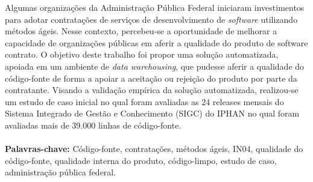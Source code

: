 \begin{resumo}

Algumas organizações da Administração Pública Federal iniciaram investimentos para adotar contratações de serviços de desenvolvimento de \textit{software} utilizando métodos ágeis. Nesse contexto, percebeu-se a oportunidade de melhorar a capacidade de organizações públicas em aferir a qualidade do produto de software contrato. O objetivo deste trabalho foi propor uma solução automatizada, apoiada em um ambiente de \textit{data warehousing}, que pudesse aferir a qualidade do código-fonte de forma a apoiar a aceitação ou rejeição do produto por parte da contratante. Visando a validação empírica da solução automatizada, realizou-se um estudo de caso inicial no qual foram avaliadas as 24 releases mensais do Sistema Integrado de Gestão e Conhecimento (SIGC) do IPHAN no qual foram avaliadas mais de 39.000 linhas de código-fonte.
{
\\
\\
\textbf{Palavras-chave:} Código-fonte, contratações, métodos ágeis, IN04, qualidade do código-fonte, qualidade interna do produto, código-limpo, estudo de caso, administração pública federal.}
\end{resumo}

